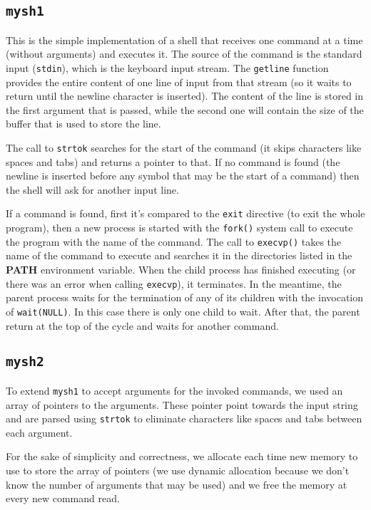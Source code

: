 \subsection{\texttt{mysh1}}
This is the simple implementation of a shell that receives one command at a time (without arguments) and executes it. The source of the command is the standard input (\texttt{stdin}), which is the keyboard input stream. The \texttt{getline} function provides the entire content of one line of input from that stream (so it waits to return until the newline character is inserted). The content of the line is stored in the first argument that is passed, while the second one will contain the size of the buffer that is used to store the line. \newline

The call to \texttt{strtok} searches for the start of the command (it skips characters like spaces and tabs) and returns a pointer to that. If no command is found (the newline is inserted before any symbol that may be the start of a command) then the shell will ask for another input line. \newline

If a command is found, first it's compared to the \texttt{exit} directive (to exit the whole program), then a new process is started with the \texttt{fork()} system call to execute the program with the name of the command. The call to \texttt{execvp()} takes the name of the command to execute and searches it in the directories listed in the \textbf{PATH} environment variable.
When the child process has finished executing (or there was an error when calling \texttt{execvp}), it terminates. In the meantime, the parent process waits for the termination of any of its children with the invocation of \texttt{wait(NULL)}. In this case there is only one child to wait. After that, the parent return at the top of the cycle and waits for another command.
\subsection{\texttt{mysh2}}
To extend \texttt{mysh1} to accept arguments for the invoked commands, we used an array of pointers to the arguments. These pointer point towards the input string and are parsed using \texttt{strtok} to eliminate characters like spaces and tabs between each argument. \newline

For the sake of simplicity and correctness, we allocate each time new memory to use to store the array of pointers (we use dynamic allocation because we don't know the number of arguments that may be used) and we free the memory at every new command read. \\ 

